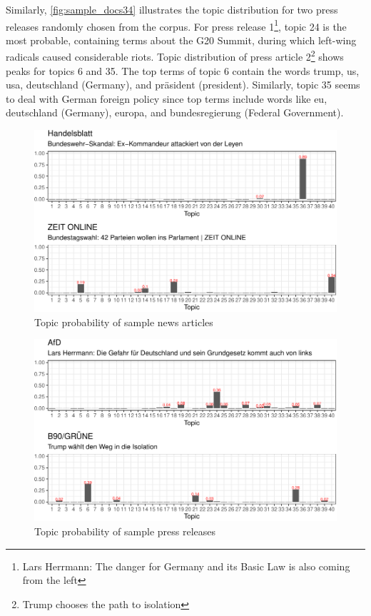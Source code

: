 \documentclass[
  12pt,
]{article}
\begin{document}
Similarly, \autoref{fig:sample_docs34} illustrates the topic
distribution for two press releases randomly chosen from the corpus. For
press release 1\footnote{Lars Herrmann: The danger for Germany and its
  Basic Law is also coming from the left}, topic 24 is the most
probable, containing terms about the G20 Summit, during which left-wing
radicals caused considerable riots. Topic distribution of press article
2\footnote{Trump chooses the path to isolation} shows peaks for topics 6
and 35. The top terms of topic 6 contain the words trump, us, usa,
deutschland (Germany), and präsident (president). Similarly, topic 35
seems to deal with German foreign policy since top terms include words
like eu, deutschland (Germany), europa, and bundesregierung (Federal
Government).

\begin{figure}

{\centering \includegraphics[width=0.9\linewidth]{newspaper_files/figure-latex/News articles sample documents-1} 

}

\caption{Topic probability of sample news articles \label{fig:sample_docs12}}\label{fig:News articles sample documents}
\end{figure}

\begin{figure}

{\centering \includegraphics[width=0.9\linewidth]{newspaper_files/figure-latex/Press releases sample documents-1} 

}

\caption{Topic probability of sample press releases \label{fig:sample_docs34}}\label{fig:Press releases sample documents}
\end{figure}
\end{document}
